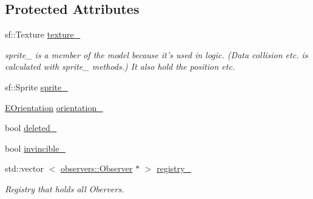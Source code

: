 \subsection*{\-Protected \-Attributes}
\begin{DoxyCompactItemize}
\item 
sf\-::\-Texture \hyperlink{classmodels_1_1Model_a3e56b29353979d719b3ca9efbac66cfd}{texture\-\_\-}
\begin{DoxyCompactList}\small\item\em sprite\-\_\- is a member of the model because it's used in logic. (\-Data collision etc. is calculated with sprite\-\_\- methods.) \-It also hold the position etc. \end{DoxyCompactList}\item 
sf\-::\-Sprite \hyperlink{classmodels_1_1Model_a5d3856c0bb519b2926d1cbfcb54d2bfe}{sprite\-\_\-}
\item 
\hyperlink{namespacemodels_adec64ede5178a8b8fed882b3790d423d}{\-E\-Orientation} \hyperlink{classmodels_1_1Model_aef96d568332ec355a18198c262425748}{orientation\-\_\-}
\item 
bool \hyperlink{classmodels_1_1Model_a8561dc3408ef6d0df91184bce30d03ff}{deleted\-\_\-}
\item 
bool \hyperlink{classmodels_1_1Model_a670ef11bf5ca17dc3ea90eed8885ffa5}{invincible\-\_\-}
\item 
std\-::vector\*
$<$ \hyperlink{classobservers_1_1Observer}{observers\-::\-Observer} $\ast$ $>$ \hyperlink{classmodels_1_1Model_a1e36031a125a5b515e1dd62155b957a9}{registry\-\_\-}
\begin{DoxyCompactList}\small\item\em \-Registry that holds all \-Obervers. \end{DoxyCompactList}\end{DoxyCompactItemize}


